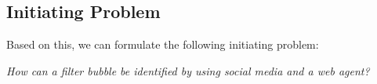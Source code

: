 \subsection*{Initiating Problem}


Based on this, we can formulate the following initiating problem:


\begin{center}
\begin{minipage}{0.8\linewidth}

\textit{How can a filter bubble be identified by using social media and a web
agent?}


\end{minipage}
\end{center}

